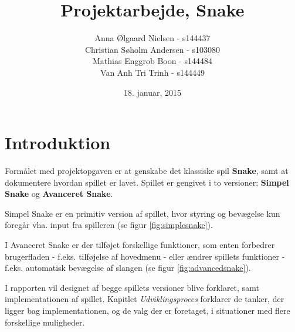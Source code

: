 \documentclass{report}
\begin{document}
\title{Projektarbejde, Snake}
\date{18. januar, 2015}
\author{	Anna Ølgaard Nielsen - 			s144437\\
Christian Søholm Andersen 	- s103080\\
Mathias Enggrob Boon - 			s144484\\
Van Anh Tri Trinh - 				s144449}

\maketitle
\tableofcontents
\newpage
\setcounter{chapter}{0}
\chapter{Introduktion}
Formålet med projektopgaven er at genskabe det klassiske spil \textbf{Snake}, samt at dokumentere hvordan spillet er lavet.
Spillet er gengivet i to versioner: \textbf{Simpel Snake} og \textbf{Avanceret Snake}. 

Simpel Snake er en primitiv version af spillet, hvor styring og bevægelse kun foregår vha. input fra spilleren (se figur \ref{fig:simplesnake}). 

I Avanceret Snake er der tilføjet forskellige funktioner, som enten forbedrer brugerfladen - f.eks. tilføjelse af hovedmenu - eller ændrer spillets funktioner - f.eks. automatisk bevægelse af slangen (se figur \ref{fig:advancedsnake}).

I rapporten vil designet af begge spillets versioner blive forklaret, samt implementationen af spillet. Kapitlet \textit{Udviklingsproces} forklarer de tanker, der ligger bag implementationen, og de valg der er foretaget, i situationer med flere forskellige muligheder.

\begin{figure}[b]
	\centering
	\graphicspath{ {pics/} }
	\hspace{0.1\textwidth}
	\caption{}
\end{figure}
\end{document}
